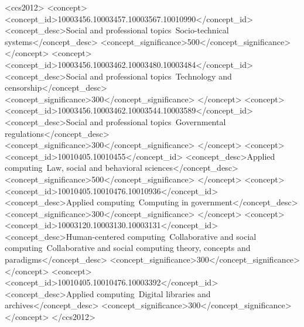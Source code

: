\documentclass[acmsmall,screen]{acmart}
\begin{document}
\begin{CCSXML}
<ccs2012>
   <concept>
       <concept_id>10003456.10003457.10003567.10010990</concept_id>
       <concept_desc>Social and professional topics~Socio-technical systems</concept_desc>
       <concept_significance>500</concept_significance>
       </concept>
   <concept>
       <concept_id>10003456.10003462.10003480.10003484</concept_id>
       <concept_desc>Social and professional topics~Technology and censorship</concept_desc>
       <concept_significance>300</concept_significance>
       </concept>
   <concept>
       <concept_id>10003456.10003462.10003544.10003589</concept_id>
       <concept_desc>Social and professional topics~Governmental regulations</concept_desc>
       <concept_significance>300</concept_significance>
       </concept>
   <concept>
       <concept_id>10010405.10010455</concept_id>
       <concept_desc>Applied computing~Law, social and behavioral sciences</concept_desc>
       <concept_significance>500</concept_significance>
       </concept>
   <concept>
       <concept_id>10010405.10010476.10010936</concept_id>
       <concept_desc>Applied computing~Computing in government</concept_desc>
       <concept_significance>300</concept_significance>
       </concept>
    <concept>
        <concept_id>10003120.10003130.10003131</concept_id>
        <concept_desc>Human-centered computing~Collaborative and social computing~Collaborative and social computing theory, concepts and paradigms</concept_desc>
        <concept_significance>300</concept_significance>
        </concept>
    <concept>
        <concept_id>10010405.10010476.10003392</concept_id>
        <concept_desc>Applied computing~Digital libraries and archives</concept_desc>
        <concept_significance>300</concept_significance>
        </concept>
 </ccs2012>
\end{CCSXML}


\end{document}
